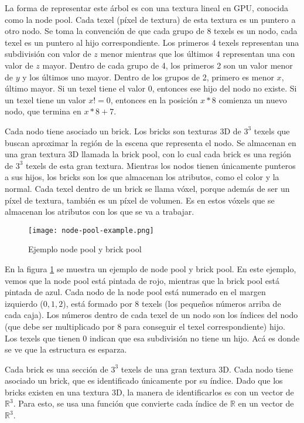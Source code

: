 La forma de representar este árbol es con una textura lineal en GPU, conocida como la node pool.
Cada texel (píxel de textura) de esta textura es un puntero a otro nodo.
Se toma la convención de que cada grupo de 8 texels es un nodo, cada texel es un puntero al hijo correspondiente.
Los primeros 4 texels representan una subdivisión con valor de $z$ menor mientras que los últimos 4 representan una con valor de $z$ mayor.
Dentro de cada grupo de 4, los primeros 2 son un valor menor de $y$ y los últimos uno mayor.
Dentro de los grupos de 2, primero es menor $x$, último mayor.
Si un texel tiene el valor $0$, entonces ese hijo del nodo no existe.
Si un texel tiene un valor $x != 0$, entonces en la posición $x * 8$ comienza un nuevo nodo, que termina en $x * 8 + 7$.

Cada nodo tiene asociado un brick.
Los bricks son texturas 3D de $3^3$ texels que buscan aproximar la región de la escena que representa el nodo.
Se almacenan en una gran textura 3D llamada la brick pool, con lo cual cada brick es una región de $3^3$ texels de esta gran textura.
Mientras los nodos tienen únicamente punteros a sus hijos, los bricks son los que almacenan los atributos, como el color y la normal.
Cada texel dentro de un brick se llama vóxel, porque además de ser un píxel de textura, también es un píxel de volumen.
Es en estos vóxels que se almacenan los atributos con los que se va a trabajar.

\begin{figure}[h!]
    \centering
    \texttt{[image: node-pool-example.png]}
    \caption{Ejemplo node pool y brick pool}
    \label{fig:node_pool_example}
\end{figure}

En la figura \ref{fig:node_pool_example} se muestra un ejemplo de node pool y brick pool.
En este ejemplo, vemos que la node pool está pintada de rojo, mientras que la brick pool está pintada de azul.
Cada nodo de la node pool está numerado en el margen izquierdo ($0, 1, 2$), está formado por $8$ texels (los pequeños números arriba de cada caja).
Los números dentro de cada texel de un nodo son los índices del nodo (que debe ser multiplicado por $8$ para conseguir el texel correspondiente) hijo.
Los texels que tienen $0$ indican que esa subdivisión no tiene un hijo.
Acá es donde se ve que la estructura es esparza.

Cada brick es una sección de $3^3$ texels de una gran textura 3D.
Cada nodo tiene asociado un brick, que es identificado únicamente por su índice.
Dado que los bricks existen en una textura 3D, la manera de identificarlos es con un vector de $\mathbb{R}^3$.
Para esto, se usa una función que convierte cada índice de $\mathbb{R}$ en un vector de $\mathbb{R}^3$.

